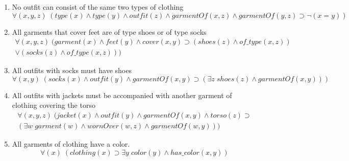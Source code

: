 \documentclass[paper=a4, fontsize=11pt]{scrartcl} %
\numberwithin{equation}{section} %
\numberwithin{figure}{section} %
\numberwithin{table}{section} %
\begin{document}
\begin{enumerate}
\item No outfit can consist of the same two types of clothing
\begin{equation*}
	\forall(x,y,z) \; (type(x) \land type(y) \land outfit(z) \land garmentOf(x,z) \land garmentOf(y,z) \supset \lnot(x=y))
\end{equation*}


\item All garments that cover feet are of type shoes or of type socks
\begin{equation*}
	\begin{split}
	\forall(x,y,z) \; (garment(x) \land feet(y) \land cover(x,y) \supset (shoes(z) \land of\_type(x,z)) \\ \lor (socks(z) \land of\_type(x,z)))
	\end{split}
\end{equation*}

\item All outfits with socks must have shoes
\begin{equation*}
	\forall(x,y) \; (socks(x) \land outfit(y) \land garmentOf(x,y) \supset (\exists z \; shoes(z) \land garmentOf(x,y)))
\end{equation*}

\item All outfits with jackets must be accompanied with another garment of clothing covering the torso
\begin{equation*}
	\begin{split}
	\forall(x,y,z) \; (jacket(x) \land outfit(y) \land garmentOf(x,y) \land torso(z) \supset \\ (\exists w \; garment(w) \land wornOver(w,z) \land garmentOf(w,y)))
	\end{split}
\end{equation*}

\item All garments of clothing have a color.
\begin{equation*}
	\forall(x) \; (clothing(x) \supset \exists y \; color(y) \land has\_color (x,y))
\end{equation*}


\end{enumerate}
\end{document}
